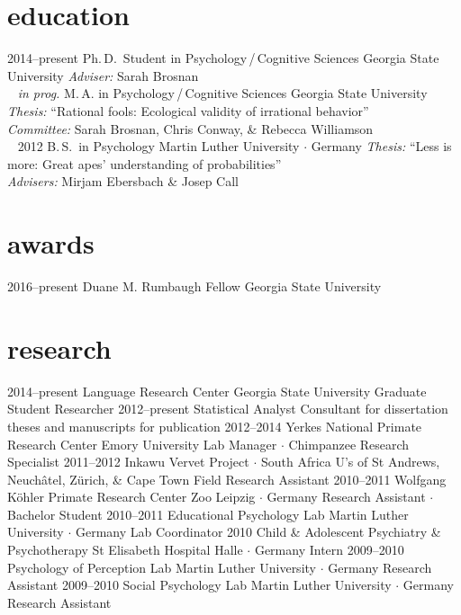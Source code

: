 \documentclass[]{friggeri-cv}
\begin{document}
\section{education}

\begin{entrylist}
  \entry
    {2014--present}
    {Ph.\,D.~Student in Psychology\,/\,Cognitive Sciences}
    {Georgia State University}
    {\emph{Adviser:} Sarah Brosnan\\~}
 \entry
   {\emph{in prog.}}
   {M.\,A. in Psychology\,/\,Cognitive Sciences}
   {Georgia State University}
   {\emph{Thesis:} ``Rational fools: Ecological validity of irrational behavior''\\
   \emph{Committee:} Sarah Brosnan, Chris Conway, \& Rebecca Williamson\\~}
  \entry
    {2012}
    {B.\,S.~in Psychology}
    {Martin Luther University $\cdot$ Germany}
    {\emph{Thesis:} ``Less is more: Great apes' understanding of probabilities''\\
    \emph{Advisers:} Mirjam Ebersbach \& Josep Call}
\end{entrylist}


\section{awards}

\begin{entrylist}
  \entry
    {2016--present}
    {Duane M. Rumbaugh Fellow}
    {Georgia State University}
    {}
\end{entrylist}

\section{research}

\begin{entrylist}
  \entry
    {2014--present}
    {Language Research Center}
    {Georgia State University}
    {Graduate Student Researcher}
  \entry
    {2012--present}
    {Statistical Analyst}
    {}
    {Consultant for dissertation theses and manuscripts for publication}
  \entry
    {2012--2014}
    {Yerkes National Primate Research Center}
    {Emory University}
    {Lab Manager $\cdot$ Chimpanzee Research Specialist}
  \entry
    {2011--2012}
    {Inkawu Vervet Project $\cdot$ South Africa}
    {U's of St Andrews, Neuch\^{a}tel, Z\"urich, \& Cape Town}
    {Field Research Assistant}
  \entry
    {2010--2011}
    {Wolfgang K\"{o}hler Primate Research Center}
    {Zoo Leipzig $\cdot$ Germany}
    {Research Assistant $\cdot$ Bachelor Student}
  \entry
    {2010--2011}
    {Educational Psychology Lab}
    {Martin Luther University $\cdot$ Germany}
    {Lab Coordinator}
  \entry
    {2010}
    {Child \& Adolescent Psychiatry \& Psychotherapy}
    {St Elisabeth Hospital Halle $\cdot$ Germany}
    {Intern}
  \entry
    {2009--2010}
    {Psychology of Perception Lab}
    {Martin Luther University $\cdot$ Germany}
    {Research Assistant}
  \entry
    {2009--2010}
    {Social Psychology Lab}
    {Martin Luther University $\cdot$ Germany}
    {Research Assistant}
\end{entrylist}
\end{document}
